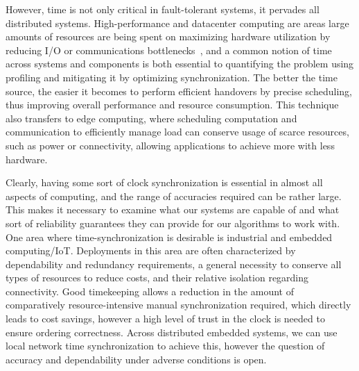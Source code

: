 However, time is not only critical in fault-tolerant systems, it pervades all distributed systems. High-performance and datacenter computing are areas large amounts of resources are being spent on maximizing hardware utilization by reducing I/O or communications bottlenecks~\cite{hpc-understanding-bottlenecks, hpc-solving-io-bottleneck, hpc-diagnosing-io-bottlenecks}, and a common notion of time across systems and components is both essential to quantifying the problem using profiling and mitigating it by optimizing synchronization. The better the time source, the easier it becomes to perform efficient handovers by precise scheduling, thus improving overall performance and resource consumption.
This technique also transfers to edge computing, where scheduling computation and communication to efficiently manage load can conserve usage of scarce resources, such as power or connectivity, allowing applications to achieve more with less hardware.

Clearly, having some sort of clock synchronization is essential in almost all aspects of computing, and the range of accuracies required can be rather large. This makes it necessary to examine what our systems are capable of and what sort of reliability guarantees they can provide for our algorithms to work with. One area where time-synchronization is desirable is industrial and embedded computing/IoT. Deployments in this area are often characterized by dependability and redundancy requirements, a general necessity to conserve all types of resources to reduce costs, and their relative isolation regarding connectivity. Good timekeeping allows a reduction in the amount of comparatively resource-intensive manual synchronization required, which directly leads to cost savings, however a high level of trust in the clock is needed to ensure ordering correctness. Across distributed embedded systems, we can use local network time synchronization to achieve this, however the question of accuracy and dependability under adverse conditions is open.

